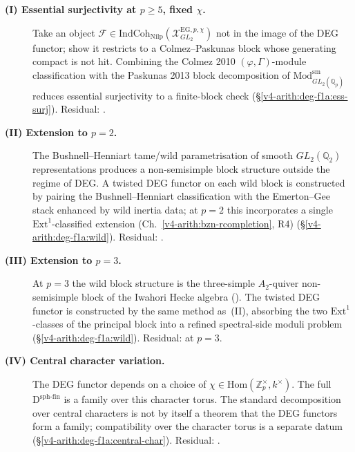 \begin{description}
\item[\textbf{(I) Essential surjectivity at \(p\geq 5\), fixed
\(\chi\).}] Take an object
\(\mathcal{F}\in\mathrm{IndCoh}_{\mathrm{Nilp}}(\mathcal{X}^{\mathrm{EG},p,\chi}_{GL_{2}})\)
not in the image of the DEG functor; show it restricts to
a Colmez--Paskunas block whose generating compact is not hit.
Combining the Colmez 2010 \((\varphi,\Gamma)\)-module classification
with the Paskunas 2013 block decomposition of \(\mathrm{Mod}_{GL_{2}(\mathbb{Q}_{p})}^{\mathrm{sm}}\)
reduces essential surjectivity to a finite-block check
(\S\ref{v4-arith:deg-f1a:ess-surj}).
Residual: .

\item[\textbf{(II) Extension to \(p=2\).}] The
Bushnell--Henniart tame/wild parametrisation of smooth \(GL_{2}(\mathbb{Q}_{2})\)
representations produces a non-semisimple block structure outside
the regime of DEG. A twisted DEG functor on each wild block is constructed
by pairing the Bushnell--Henniart classification with the Emerton--Gee stack
enhanced by wild inertia data; at \(p=2\) this incorporates a single
\(\mathrm{Ext}^{1}\)-classified extension (Ch.~\ref{v4-arith:bzn-rcompletion}, R4)
(\S\ref{v4-arith:deg-f1a:wild}).
Residual: .

\item[\textbf{(III) Extension to \(p=3\).}] At
\(p=3\) the wild block structure is the three-simple \(A_{2}\)-quiver
non-semisimple block of the Iwahori Hecke algebra
(). The twisted DEG
functor is constructed by the same method as~(II), absorbing the two
\(\mathrm{Ext}^{1}\)-classes of the principal block into a refined
spectral-side moduli problem (\S\ref{v4-arith:deg-f1a:wild}).
Residual:  at \(p=3\).

\item[\textbf{(IV) Central character variation.}]
The DEG functor depends on a choice of
\(\chi\in\mathrm{Hom}(\mathbb{Z}_{p}^{\times},k^{\times})\).
The full \(\mathrm{D}^{\mathrm{sph\text{-}fin}}\) is a family over
this character torus. The standard decomposition over central
characters is not by itself a theorem that the DEG functors form a
family; compatibility over the character torus is a separate datum
(\S\ref{v4-arith:deg-f1a:central-char}).
Residual: .


\end{description}
